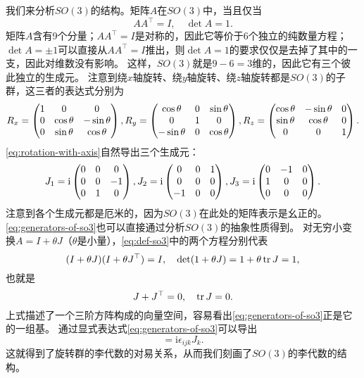 \documentclass[hyperref, UTF8, a4paper]{ctexart}
\newcommand*{\ii}{\mathrm{i}}
\begin{document}
我们来分析$SO(3)$的结构。矩阵$A$在$SO(3)$中，当且仅当
\begin{equation}
    A A^\top = I, \quad \det A = 1.
    \label{eq:def-so3}
\end{equation}
矩阵$A$含有9个分量；$A A^\top = I$是对称的，因此它等价于6个独立的纯数量方程；
$\det A = \pm 1$可以直接从$A A^\top=I$推出，则$\det A = 1$的要求仅仅是去掉了其中的一支，因此对维数没有影响。
这样，$SO(3)$就是$9-6=3$维的，因此它有三个彼此独立的生成元。
注意到绕$x$轴旋转、绕$y$轴旋转、绕$z$轴旋转都是$SO(3)$的子群，这三者的表达式分别为
\begin{equation}
    R_x = \pmqty{1 & 0 & 0 \\ 0 & \cos \theta & -\sin \theta \\ 0 & \sin \theta & \cos \theta}, 
    R_y = \pmqty{\cos \theta & 0 & \sin \theta \\ 0 & 1 & 0 \\ - \sin \theta & 0 & \cos \theta}, 
    R_z = \pmqty{\cos \theta & - \sin \theta & 0 \\ \sin \theta & \cos \theta & 0 \\ 0 & 0 & 1}.
    \label{eq:rotation-with-axis}
\end{equation}
\eqref{eq:rotation-with-axis}自然导出三个生成元：
\begin{equation}
    J_1 = \ii \pmqty{0 & 0 & 0 \\ 0 & 0 & -1 \\ 0 & 1 & 0}, 
    J_2 = \ii \pmqty{0 & 0 & 1 \\ 0 & 0 & 0 \\ -1 & 0 & 0}, \\
    J_3 = \ii \pmqty{0 & -1 & 0 \\ 1 & 0 & 0 \\ 0 & 0 & 0}.
    \label{eq:generators-of-so3}
\end{equation}
注意到各个生成元都是厄米的，因为$SO(3)$在此处的矩阵表示是幺正的。
\eqref{eq:generators-of-so3}也可以直接通过分析$SO(3)$的抽象性质得到。
对无穷小变换$A = I + \theta J$（$\theta$是小量），\eqref{eq:def-so3}中的两个方程分别代表
\[
    (I+\theta J) (I + \theta J^\top) = I, \quad \det (1 + \theta J) = 1 + \theta \trace J = 1,
\]
也就是
\[
    J + J^\top = 0, \quad \trace J = 0.
\]
上式描述了一个三阶方阵构成的向量空间，容易看出\eqref{eq:generators-of-so3}正是它的一组基。
通过显式表达式\eqref{eq:generators-of-so3}可以导出
\begin{equation}
    [J_i, J_j] = \ii \epsilon_{ijk} J_k.
    \label{eq:lie-algebra-so3}
\end{equation}
这就得到了旋转群的李代数的对易关系，从而我们刻画了$SO(3)$的李代数的结构。
\end{document}
